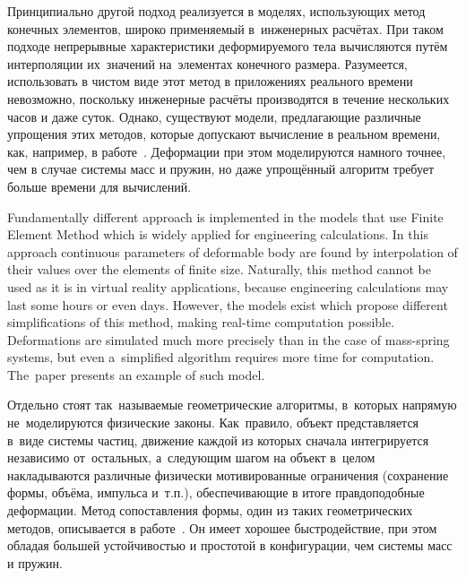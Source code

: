 \documentclass[a4paper, 12pt, titlepage]{extarticle}
\begin{document}
\begin{original}
    Принципиально другой подход реализуется в моделях, использующих метод конечных элементов, широко
    применяемый в~инженерных расчётах. При таком подходе
    непрерывные характеристики деформируемого тела вычисляются путём интерполяции их~значений
    на~элементах конечного размера. Разумеется, использовать в чистом виде этот метод
    в приложениях реального времени невозможно, поскольку инженерные расчёты производятся в
    течение нескольких часов и даже суток. Однако, существуют модели, предлагающие различные упрощения этих
    методов, которые допускают вычисление в реальном времени, как, например, в работе~\cite{mueller-stable}.
    Деформации при этом моделируются намного точнее, чем в случае системы масс и пружин, но даже
    упрощённый алгоритм требует больше времени для вычислений. %
\end{original}

    Fundamentally different approach is implemented in the models that use Finite Element Method
    which is widely applied for engineering calculations. In this approach continuous parameters of
    deformable body are found by interpolation of their values over the elements of finite size.
    Naturally, this method cannot be used as it is in virtual reality applications, because
    engineering calculations may last some hours or even days. However, the models exist which
    propose different simplifications of this method, making real-time computation possible.
    Deformations are simulated much more precisely than in the case of mass-spring systems, but even
    a~simplified algorithm requires more time for computation. The~paper \cite{mueller-stable}
    presents an example of such model.

\begin{original}
    Отдельно стоят так~называемые геометрические алгоритмы, в~которых напрямую не~моделируются
    физические законы. Как~правило, объект представляется в~виде системы частиц, движение каждой из
    которых сначала интегрируется независимо от~остальных, а~следующим шагом на объект в~целом
    накладываются различные физически мотивированные ограничения (сохранение формы, объёма, импульса
    и~т.п.), обеспечивающие в итоге правдоподобные деформации. Метод сопоставления формы, один из
    таких геометрических методов, описывается в работе~\cite{mueller-meshless}. Он имеет хорошее быстродействие,
    при этом обладая большей устойчивостью и простотой в конфигурации, чем системы масс и пружин.
\end{original}
\end{document}

